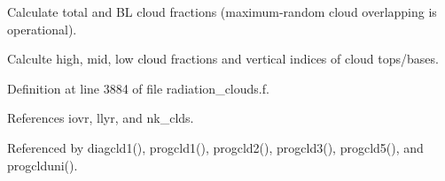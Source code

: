 \begin{DoxyEnumerate}
\item Calculate total and BL cloud fractions (maximum-\/random cloud overlapping is operational).
\item Calculte high, mid, low cloud fractions and vertical indices of cloud tops/bases. 
\end{DoxyEnumerate}

Definition at line 3884 of file radiation\+\_\+clouds.\+f.



References iovr, llyr, and nk\+\_\+clds.



Referenced by diagcld1(), progcld1(), progcld2(), progcld3(), progcld5(), and progclduni().

\mbox{\label{group__module__radiation__clouds_gafa23f5bc69fa713abfa32939fd96ade8}} 

